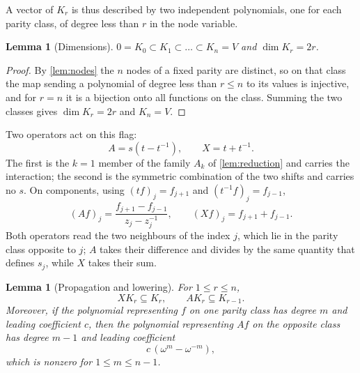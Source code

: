 \documentclass[11pt,reqno]{amsart}
\theoremstyle{plain}
\newtheorem{lemma}[theorem]{Lemma}
\theoremstyle{definition}
\theoremstyle{remark}
\numberwithin{equation}{section}
\begin{document}
A vector of $K_{r}$ is thus described by two independent polynomials, one for
each parity class, of degree less than $r$ in the node variable.

\begin{lemma}[Dimensions]
\label{lem:flag-dim}
$0=K_{0}\subset K_{1}\subset\dots\subset K_{n}=V$ and $\dim K_{r}=2r$.
\end{lemma}

\begin{proof}
By \cref{lem:nodes} the $n$ nodes of a fixed parity are distinct, so on that
class the map sending a polynomial of degree less than $r\le n$ to its values
is injective, and for $r=n$ it is a bijection onto all functions on the class.
Summing the two classes gives $\dim K_{r}=2r$ and $K_{n}=V$.
\end{proof}

Two operators act on this flag:
\begin{equation}
  A=s(t-t^{-1}),
  \qquad
  X=t+t^{-1}.
  \label{eq:AX}
\end{equation}
The first is the $k=1$ member of the family $A_{k}$ of \cref{lem:reduction} and
carries the interaction; the second is the symmetric combination of the two
shifts and carries no $s$. On components, using $(tf)_{j}=f_{j+1}$ and
$(t^{-1}f)_{j}=f_{j-1}$,
\begin{equation}
  (Af)_{j}=\frac{f_{j+1}-f_{j-1}}{z_{j}-z_{j}^{-1}},
  \qquad
  (Xf)_{j}=f_{j+1}+f_{j-1}.
  \label{eq:component-actions}
\end{equation}
Both operators read the two neighbours of the index $j$, which lie in the
parity class opposite to $j$; $A$ takes their difference and divides by the
same quantity that defines $s_{j}$, while $X$ takes their sum.

\begin{lemma}[Propagation and lowering]
\label{lem:lowering}
For $1\le r\le n$,
\begin{equation*}
  XK_{r}\subseteq K_{r},
  \qquad
  AK_{r}\subseteq K_{r-1}.
\end{equation*}
Moreover, if the polynomial representing $f$ on one parity class has degree
$m$ and leading coefficient $c$, then the polynomial representing $Af$ on the
opposite class has degree $m-1$ and leading coefficient
\begin{equation}
  c\,(\omega^{m}-\omega^{-m}),
  \label{eq:leading-coefficient}
\end{equation}
which is nonzero for $1\le m\le n-1$.
\end{lemma}
\end{document}
